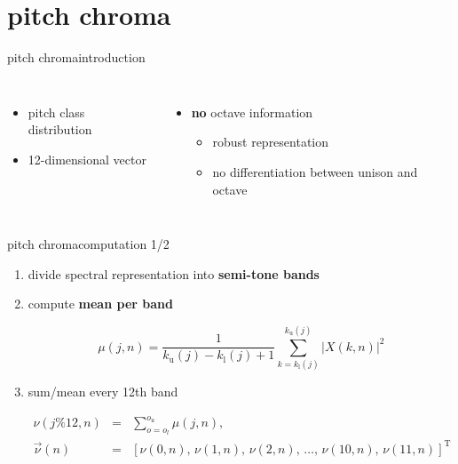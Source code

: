     \section[pitch chroma]{pitch chroma}
        \begin{frame}{pitch chroma}{introduction}
            \begin{columns}
                \begin{itemize}
                    \item	pitch class distribution 
                    \item	12-dimensional vector
                \end{itemize}
                \begin{itemize}
                    \item	\textbf{no} octave information
                        \begin{itemize}
                            \item	robust representation
                            \item	no differentiation between unison and octave
                        \end{itemize}
                \end{itemize}
                
            \end{columns}
        \end{frame}
        \begin{frame}{pitch chroma}{computation 1/2}
            \begin{enumerate}
                \item	divide spectral representation into \textbf{semi-tone bands}
                \item<2->	compute \textbf{mean per band}
                    \begin{footnotesize}
                        \begin{equation*}
                            \mu(j,n)		= \frac{1}{k_{\mathrm{u}}(j)-k_{\mathrm{l}}(j)+1}\sum\limits_{k=k_{\mathrm{l}}(j)}^{k_{\mathrm{u}}(j)}{|X(k,n)|^2}
                        \end{equation*}
                    \end{footnotesize}
                \item<3->	sum/mean every 12th band
                    \begin{footnotesize}
                        \begin{eqnarray*}
                            \nu(j\% 12 ,n)		&=& \sum\limits_{o=o_l}^{o_u}{\mu(j,n)}\label{eq:pc}, \\
                            \vec{\nu}(n) 	&=& \left[\nu(0,n),\, \nu(1,n),\, \nu(2,n),\, \ldots,\, \nu(10,n),\, \nu(11,n)\right]^\mathrm{T} \nonumber
                        \end{eqnarray*}
                    \end{footnotesize}
            \end{enumerate}
        \end{frame}
